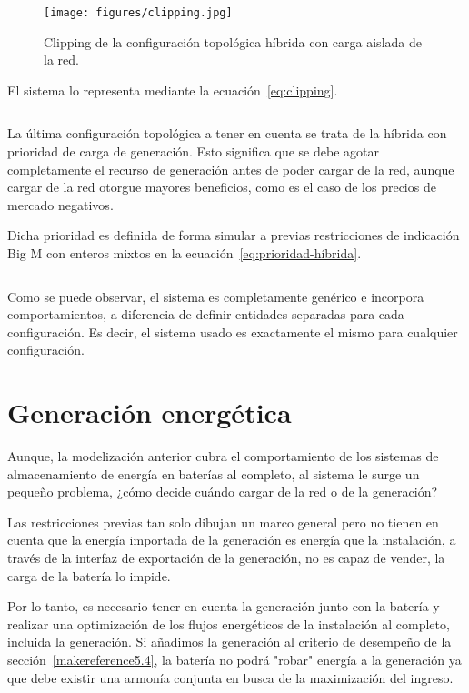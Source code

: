 \begin{figure}
  \centering
  \texttt{[image: figures/clipping.jpg]}
  \caption{Clipping de la configuración topológica híbrida con carga aislada de la red.}
  \label{fig:clipping}
\end{figure}

El sistema lo representa mediante la ecuación~\ref{eq:clipping}.

\begin{equation}
  \label{eq:clipping}
\end{equation}

La última configuración topológica a tener en cuenta se trata de la híbrida con prioridad de carga de generación. Esto significa que se debe agotar completamente el recurso de generación antes de poder cargar de la red, aunque cargar de la red otorgue mayores beneficios, como es el caso de los precios de mercado negativos.

Dicha prioridad es definida de forma simular a previas restricciones de indicación Big M con enteros mixtos en la ecuación~\ref{eq:prioridad-híbrida}.

\begin{equation}
  \label{eq:prioridad-híbrida}
\end{equation}

Como se puede observar, el sistema es completamente genérico e incorpora comportamientos, a diferencia de definir entidades separadas para cada configuración. Es decir, el sistema usado es exactamente el mismo para cualquier configuración.

\section{Generación energética}
\label{makereference5.3}

Aunque, la modelización anterior cubra el comportamiento de los sistemas de almacenamiento de energía en baterías al completo, al sistema le surge un pequeño problema, ¿cómo decide cuándo cargar de la red o de la generación?

Las restricciones previas tan solo dibujan un marco general pero no tienen en cuenta que la energía importada de la generación es energía que la instalación, a través de la interfaz de exportación de la generación, no es capaz de vender, la carga de la batería lo impide.

Por lo tanto, es necesario tener en cuenta la generación junto con la batería y realizar una optimización de los flujos energéticos de la instalación al completo, incluida la generación. Si añadimos la generación al criterio de desempeño de la sección~\ref{makereference5.4}, la batería no podrá "robar" energía a la generación ya que debe existir una armonía conjunta en busca de la maximización del ingreso.

